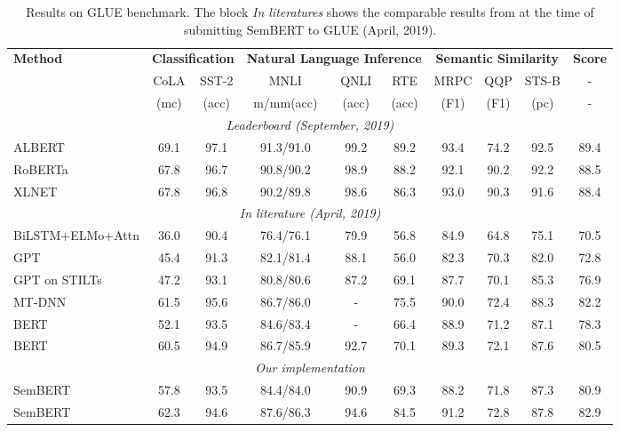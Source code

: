 \documentclass[letterpaper]{article} \usepackage{aaai20}  \usepackage{times}  \usepackage{helvet} \usepackage{courier}  \usepackage[hyphens]{url}  \usepackage{graphicx} \urlstyle{rm} \def\UrlFont{\rm}  \usepackage{graphicx}  \frenchspacing  \usepackage{amssymb}
\begin{document}
\begin{table*}
	\centering
	\resizebox{\linewidth}{!}
	{
		\begin{tabular}{lccccccccc}
			\hline
			
			\hline
			\textbf{Method} &  \multicolumn{2}{c}{\textbf{Classification}} &\multicolumn{3}{c}{\textbf{Natural Language Inference}} & \multicolumn{3}{c}{\textbf{Semantic Similarity}} &  \textbf{Score}\\
			
			& CoLA & SST-2 & MNLI & QNLI & RTE  & MRPC  & QQP & STS-B & -\\ 
			&  (mc) & (acc)	& m/mm(acc) & (acc) & (acc)  & (F1) & (F1) & (pc) & -\\
			\hline
			\multicolumn{10}{c}{\emph{Leaderboard (September, 2019)}} \\
			ALBERT & 69.1 & 97.1 &  91.3/91.0 & 99.2 & 89.2  & 93.4 & 74.2  & 92.5  & 89.4\\
			RoBERTa & 67.8 & 96.7 & 90.8/90.2 & 98.9 & 88.2 & 92.1 & 90.2 & 92.2 & 88.5 \\
			XLNET & 67.8 & 96.8 & 90.2/89.8 & 98.6 & 86.3 & 93.0 & 90.3 & 91.6 & 88.4 \\
			\hline
			\multicolumn{10}{c}{\emph{In literature (April, 2019)}} \\
			BiLSTM+ELMo+Attn &36.0 & 90.4 &76.4/76.1&79.9& 56.8 &84.9&64.8  & 75.1 &  70.5\\
			GPT& 45.4 & 91.3  & 82.1/81.4 & 88.1 & 56.0 & 82.3  & 70.3 & 82.0 & 72.8\\
			GPT on STILTs & 47.2 & 93.1   & 80.8/80.6 & 87.2 & 69.1 & 87.7 & 70.1 &85.3  & 76.9\\
			MT-DNN & 61.5 & 95.6   & 86.7/86.0 & - & 75.5 & 90.0 & 72.4 & 88.3  & 82.2\\
			\hdashline
			BERT  & 52.1 & 93.5  & 84.6/83.4 &  - & 66.4 & 88.9 & 71.2  & 87.1 & 78.3\\
			BERT &60.5 & 94.9 &  86.7/85.9 & 92.7 & 70.1  & 89.3 & 72.1 & 87.6 & 80.5\\
			\hline
			\multicolumn{10}{c}{\emph{Our implementation}} \\
			SemBERT   & 57.8 &93.5 &84.4/84.0 & 90.9 & 69.3  & 88.2 & 71.8 & 87.3 &  80.9\\
			SemBERT & 62.3 & 94.6 & 87.6/86.3 & 94.6 & 84.5 & 91.2 & 72.8 & 87.8 &  82.9\\
			\hline
			
			\hline
		\end{tabular}
	}
	
	\caption{\label{tab:glue} Results on GLUE benchmark. The block \emph{In literatures} shows the  comparable results from \cite{liu2019multi,radford2018improving} at the time of submitting SemBERT to GLUE (April, 2019).
	}
	
\end{table*}
\end{document}
